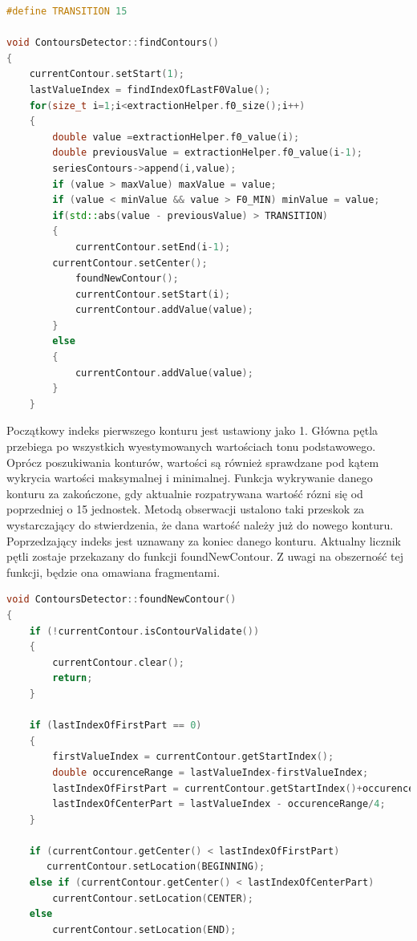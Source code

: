 \documentclass[a4paper,12 pt]{article}
\begin{document}
\begin{lstlisting}[caption={Początkowa faza funkcji wykrywającej kontury},label={lst:label},language=C++]
#define TRANSITION 15

void ContoursDetector::findContours()
{
    currentContour.setStart(1);
    lastValueIndex = findIndexOfLastF0Value();
    for(size_t i=1;i<extractionHelper.f0_size();i++)
    {
        double value =extractionHelper.f0_value(i);
        double previousValue = extractionHelper.f0_value(i-1); 
        seriesContours->append(i,value);
        if (value > maxValue) maxValue = value;
        if (value < minValue && value > F0_MIN) minValue = value;
        if(std::abs(value - previousValue) > TRANSITION)
        {
            currentContour.setEnd(i-1);
  	    currentContour.setCenter();    
            foundNewContour();
            currentContour.setStart(i);
            currentContour.addValue(value);
        }
        else
        {
            currentContour.addValue(value);
        }
    }
\end{lstlisting}
Początkowy indeks pierwszego konturu jest ustawiony jako 1. Główna pętla przebiega po wszystkich wyestymowanych wartościach tonu podstawowego. Oprócz poszukiwania konturów, wartości są również sprawdzane pod kątem wykrycia wartości maksymalnej i minimalnej. Funkcja wykrywanie danego konturu za zakończone, gdy aktualnie rozpatrywana wartość rózni się od poprzedniej o 15 jednostek. Metodą obserwacji ustalono taki przeskok za wystarczający do stwierdzenia, że dana wartość należy już do nowego konturu. Poprzedzający indeks jest uznawany za koniec danego konturu. Aktualny licznik pętli zostaje przekazany do funkcji foundNewContour. Z uwagi na obszerność tej funkcji, będzie ona omawiana fragmentami.
\begin{lstlisting}[caption={Funkcja zajmująca się analizą wstępną wykrytego konturu},label={lst:label},language=C++]
void ContoursDetector::foundNewContour()
{
    if (!currentContour.isContourValidate())
    {
        currentContour.clear();
        return;
    }
    
    if (lastIndexOfFirstPart == 0)
    {
        firstValueIndex = currentContour.getStartIndex();
        double occurenceRange = lastValueIndex-firstValueIndex;
        lastIndexOfFirstPart = currentContour.getStartIndex()+occurenceRange/4;
        lastIndexOfCenterPart = lastValueIndex - occurenceRange/4;
    }
    
    if (currentContour.getCenter() < lastIndexOfFirstPart)
       currentContour.setLocation(BEGINNING);
    else if (currentContour.getCenter() < lastIndexOfCenterPart)
        currentContour.setLocation(CENTER);
    else
        currentContour.setLocation(END);
            
\end{lstlisting}
\end{document}
